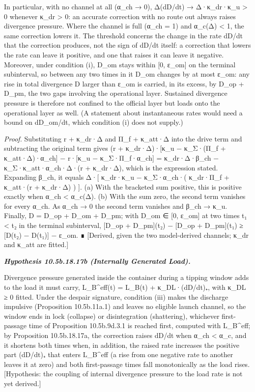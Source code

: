 \documentclass[
]{article}
\begin{document}
In particular, with no channel at all (α\_ch → 0), Δ(dD/dt) →
Δ·κ\_dr·κ\_u \textgreater{} 0 whenever κ\_dr \textgreater{} 0: an
accurate correction with no route out always raises divergence pressure.
Where the channel is full (α\_ch = 1) and α\_c(Δ) \textless{} 1, the
same correction lowers it. The threshold concerns the change in the rate
dD/dt that the correction produces, not the sign of dD/dt itself: a
correction that lowers the rate can leave it positive, and one that
raises it can leave it negative. Moreover, under condition (i), D\_om
stays within {[}0, ε\_om{]} on the terminal subinterval, so between any
two times in it D\_om changes by at most ε\_om: any rise in total
divergence D larger than ε\_om is carried, in its excess, by D\_op +
D\_pm, the two gaps involving the operational layer. Sustained
divergence pressure is therefore not confined to the official layer but
loads onto the operational layer as well. (A statement about
instantaneous rates would need a bound on dD\_om/dt, which condition (i)
does not supply.)

\emph{Proof.} Substituting r + κ\_dr·Δ and Π\_f + κ\_att·Δ into the
drive term and subtracting the original term gives (r + κ\_dr·Δ)·{[}κ\_u
− κ\_Σ·(Π\_f + κ\_att·Δ)·α\_ch{]} − r·{[}κ\_u − κ\_Σ·Π\_f·α\_ch{]} =
κ\_dr·Δ·β\_ch − κ\_Σ·κ\_att·α\_ch·Δ·(r + κ\_dr·Δ), which is the
expression stated. Expanding β\_ch, it equals Δ·{[} κ\_dr·κ\_u −
κ\_Σ·α\_ch·( κ\_dr·Π\_f + κ\_att·(r + κ\_dr·Δ) ) {]}. (a) With the
bracketed sum positive, this is positive exactly when α\_ch \textless{}
α\_c(Δ). (b) With the sum zero, the second term vanishes for every
α\_ch. As α\_ch → 0 the second term vanishes and β\_ch → κ\_u. Finally,
D = D\_op + D\_om + D\_pm; with D\_om ∈ {[}0, ε\_om{]} at two times t₁
\textless{} t₂ in the terminal subinterval, {[}D\_op + D\_pm{]}(t₂) −
{[}D\_op + D\_pm{]}(t₁) ≥ {[}D(t₂) − D(t₁){]} − ε\_om. ∎ {[}Derived,
given the two model-derived channels; κ\_dr and κ\_att are fitted.{]}

\emph{\textbf{Hypothesis 10.5b.18.17b (Internally Generated Load).}}

Divergence pressure generated inside the container during a tipping
window adds to the load it must carry, L\_B\^{}eff(t) = L\_B(t) +
κ\_DL·(dD/dt)₊, with κ\_DL ≥ 0 fitted. Under the despair signature,
condition (iii) makes the discharge impulsive (Proposition 10.5b.11a.1)
and leaves no eligible launch channel, so the window ends in lock
(collapse) or disintegration (shattering), whichever first-passage time
of Proposition 10.5b.9d.3.1 is reached first, computed with L\_B\^{}eff;
by Proposition 10.5b.18.17a, the correction raises dD/dt when α\_ch
\textless{} α\_c, and it shortens both times when, in addition, the
raised rate increases the positive part (dD/dt)₊ that enters L\_B\^{}eff
(a rise from one negative rate to another leaves it at zero) and both
first-passage times fall monotonically as the load rises. {[}Hypothesis:
the coupling of internal divergence pressure to the load rate is not yet
derived.{]}
\end{document}
